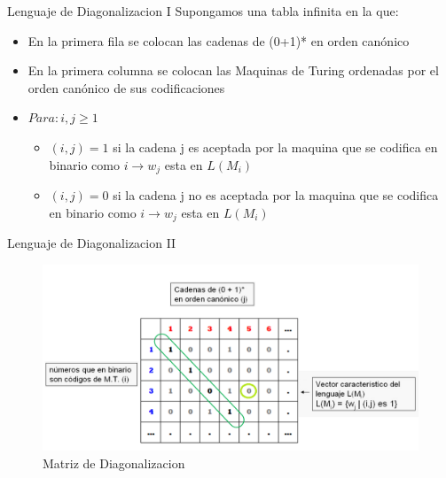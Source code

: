 \documentclass[11pt]{beamer}
\begin{document}
		
		\begin{frame}{Lenguaje de Diagonalizacion I}
			\justifying
			Supongamos una tabla infinita en la que:
			\begin{itemize}
                \item En la primera fila se colocan las cadenas de (0+1)* en orden canónico
                \item En la primera columna se colocan las Maquinas de Turing ordenadas por el orden canónico de sus codificaciones
                \item $Para: i, j \geq 1 $
                    \begin{itemize}
                        \item $ (i, j) = 1$ si la cadena j es aceptada por la maquina que se codifica en binario como $i \to w_j$ esta en $L(M_i) $
                        \item $ (i, j) = 0$ si la cadena j no es aceptada por la maquina que se codifica en binario como $i \to w_j$ esta en $L(M_i) $
                    \end{itemize}
            \end{itemize}
		\end{frame}
		
		\begin{frame}{Lenguaje de Diagonalizacion II}
		
		    \justifying
		    
		    \begin{figure}[H]
				\centering
				\includegraphics[scale=0.4]{img/inde_diagonaliz.png}
				\caption{Matriz de Diagonalizacion}
				\label{fig: diagonalizacion}
			\end{figure}
		    
		\end{frame}
		
\end{document}
